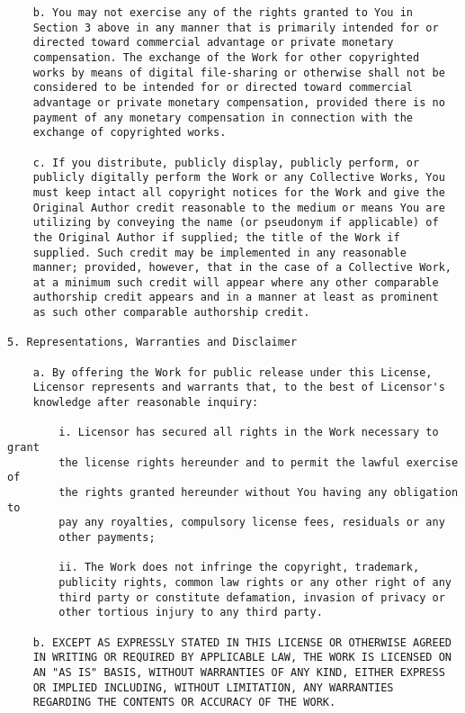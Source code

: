 \begin{verbatim}
    b. You may not exercise any of the rights granted to You in
    Section 3 above in any manner that is primarily intended for or
    directed toward commercial advantage or private monetary
    compensation. The exchange of the Work for other copyrighted
    works by means of digital file-sharing or otherwise shall not be
    considered to be intended for or directed toward commercial
    advantage or private monetary compensation, provided there is no
    payment of any monetary compensation in connection with the
    exchange of copyrighted works.

    c. If you distribute, publicly display, publicly perform, or
    publicly digitally perform the Work or any Collective Works, You
    must keep intact all copyright notices for the Work and give the
    Original Author credit reasonable to the medium or means You are
    utilizing by conveying the name (or pseudonym if applicable) of
    the Original Author if supplied; the title of the Work if
    supplied. Such credit may be implemented in any reasonable
    manner; provided, however, that in the case of a Collective Work,
    at a minimum such credit will appear where any other comparable
    authorship credit appears and in a manner at least as prominent
    as such other comparable authorship credit.

5. Representations, Warranties and Disclaimer

    a. By offering the Work for public release under this License,
    Licensor represents and warrants that, to the best of Licensor's
    knowledge after reasonable inquiry:

        i. Licensor has secured all rights in the Work necessary to grant
        the license rights hereunder and to permit the lawful exercise of
        the rights granted hereunder without You having any obligation to
        pay any royalties, compulsory license fees, residuals or any
        other payments;

        ii. The Work does not infringe the copyright, trademark,
        publicity rights, common law rights or any other right of any
        third party or constitute defamation, invasion of privacy or
        other tortious injury to any third party.

    b. EXCEPT AS EXPRESSLY STATED IN THIS LICENSE OR OTHERWISE AGREED
    IN WRITING OR REQUIRED BY APPLICABLE LAW, THE WORK IS LICENSED ON
    AN "AS IS" BASIS, WITHOUT WARRANTIES OF ANY KIND, EITHER EXPRESS
    OR IMPLIED INCLUDING, WITHOUT LIMITATION, ANY WARRANTIES
    REGARDING THE CONTENTS OR ACCURACY OF THE WORK.


\end{verbatim}

